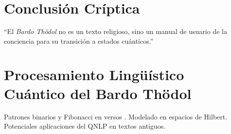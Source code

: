 \documentclass[12pt,a4paper]{article}
\begin{document}
\section{Conclusión Críptica}
“El \emph{Bardo Thödol} no es un texto religioso, 
sino un manual de usuario de la conciencia para su transición a estados cuánticos.”

\appendix
\section{Procesamiento Lingüístico Cuántico del Bardo Thödol}
Patrones binarios y Fibonacci en versos \cite{kyoto2024linguistics}.  
Modelado en espacios de Hilbert.  
Potenciales aplicaciones del QNLP en textos antiguos.

\printbibliography
\end{document}
